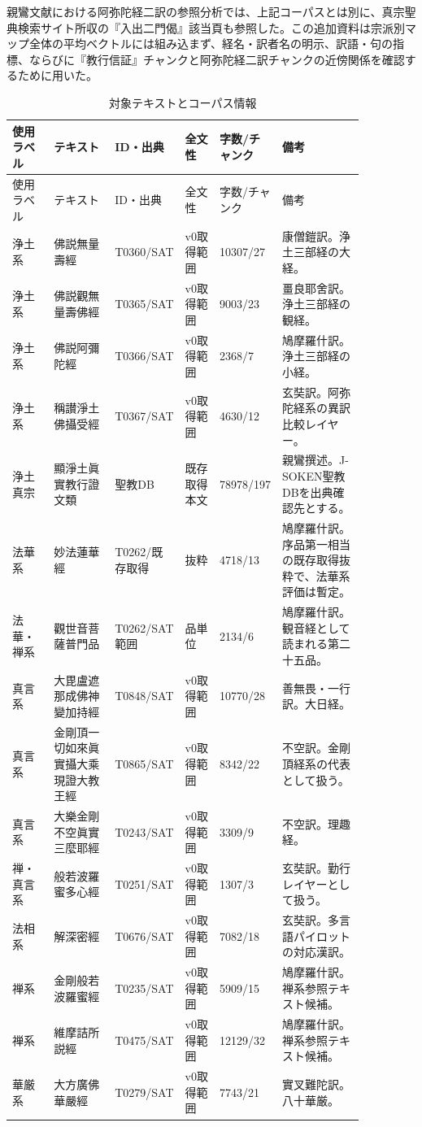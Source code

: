 \documentclass[uplatex,dvipdfmx,11pt,a4paper]{jsarticle}
\begin{document}
親鸞文献における阿弥陀経二訳の参照分析では、上記コーパスとは別に、真宗聖典検索サイト所収の『入出二門偈』該当頁も参照した。この追加資料は宗派別マップ全体の平均ベクトルには組み込まず、経名・訳者名の明示、訳語・句の指標、ならびに『教行信証』チャンクと阿弥陀経二訳チャンクの近傍関係を確認するために用いた。

{\small
\setlength{\tabcolsep}{3pt}
\begin{longtable}{@{}p{0.12\linewidth}p{0.18\linewidth}p{0.12\linewidth}p{0.10\linewidth}p{0.10\linewidth}p{0.24\linewidth}@{}}
\caption{対象テキストとコーパス情報}\\
\toprule
使用ラベル & テキスト & ID・出典 & 全文性 & 字数/チャンク & 備考 \\
\midrule
\endfirsthead
\toprule
使用ラベル & テキスト & ID・出典 & 全文性 & 字数/チャンク & 備考 \\
\midrule
\endhead
浄土系 & 佛説無量壽經 & T0360/SAT & v0取得範囲 & 10307/27 & 康僧鎧訳。浄土三部経の大経。 \\
浄土系 & 佛説觀無量壽佛經 & T0365/SAT & v0取得範囲 & 9003/23 & 畺良耶舍訳。浄土三部経の観経。 \\
浄土系 & 佛説阿彌陀經 & T0366/SAT & v0取得範囲 & 2368/7 & 鳩摩羅什訳。浄土三部経の小経。 \\
浄土系 & 稱讃淨土佛攝受經 & T0367/SAT & v0取得範囲 & 4630/12 & 玄奘訳。阿弥陀経系の異訳比較レイヤー。 \\
浄土真宗 & 顯淨土眞實教行證文類 & 聖教DB & 既存取得本文 & 78978/197 & 親鸞撰述。J-SOKEN聖教DBを出典確認先とする。 \\
法華系 & 妙法蓮華經 & T0262/既存取得 & 抜粋 & 4718/13 & 鳩摩羅什訳。序品第一相当の既存取得抜粋で、法華系評価は暫定。 \\
法華・禅系 & 觀世音菩薩普門品 & T0262/SAT範囲 & 品単位 & 2134/6 & 鳩摩羅什訳。観音経として読まれる第二十五品。 \\
真言系 & 大毘盧遮那成佛神變加持經 & T0848/SAT & v0取得範囲 & 10770/28 & 善無畏・一行訳。大日経。 \\
真言系 & 金剛頂一切如來眞實攝大乘現證大教王經 & T0865/SAT & v0取得範囲 & 8342/22 & 不空訳。金剛頂経系の代表として扱う。 \\
真言系 & 大樂金剛不空眞實三麼耶經 & T0243/SAT & v0取得範囲 & 3309/9 & 不空訳。理趣経。 \\
禅・真言系 & 般若波羅蜜多心經 & T0251/SAT & v0取得範囲 & 1307/3 & 玄奘訳。勤行レイヤーとして扱う。 \\
法相系 & 解深密經 & T0676/SAT & v0取得範囲 & 7082/18 & 玄奘訳。多言語パイロットの対応漢訳。 \\
禅系 & 金剛般若波羅蜜經 & T0235/SAT & v0取得範囲 & 5909/15 & 鳩摩羅什訳。禅系参照テキスト候補。 \\
禅系 & 維摩詰所説經 & T0475/SAT & v0取得範囲 & 12129/32 & 鳩摩羅什訳。禅系参照テキスト候補。 \\
華厳系 & 大方廣佛華嚴經 & T0279/SAT & v0取得範囲 & 7743/21 & 實叉難陀訳。八十華厳。 \\
\bottomrule
\end{longtable}
}
\end{document}
